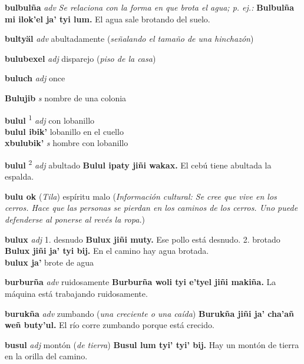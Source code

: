 \documentclass[10pt]{scrbook}
\newcommand{\entry}[1]{\textbf{#1}}
\newcommand{\onedefinition}[1]{#1.}
\newcommand{\defsuperscript}[1]{\textsuperscript{#1}}
\newcommand{\nontranslationdef}[1]{\textit{#1}}
\newcommand{\partofspeech}[1]{\textit{#1}}
\newcommand{\spanishtranslation}[1]{#1}
\newcommand{\clarification}[1]{(\textit{#1})}
\newcommand{\cholexample}[1]{\textbf{#1}}
\newcommand{\exampletranslation}[1]{#1}
\newcommand{\relevantdialect}[1]{(\textit{#1})}
\newcommand{\culturalinformation}[1]{(\textit{#1})}
\newcommand{\secondaryentry}[1]{\\\textbf{#1}}
\newcommand{\secondpartofspeech}[1]{\textit{#1}}
\newcommand{\secondtranslation}[1]{#1}
\begin{document}
\begin{multicols}{2}
\entry{bulbulña}
\partofspeech{adv}
\nontranslationdef{Se relaciona con la forma en que brota el agua; p. ej.:}
\cholexample{Bulbulña mi ilok'el ja' tyi lum.}
\exampletranslation{El agua sale brotando del suelo.}

\entry{bultyäl}
\partofspeech{adv}
\spanishtranslation{abultadamente}
\clarification{señalando el tamaño de una hinchazón}

\entry{bulubexel}
\partofspeech{adj}
\spanishtranslation{disparejo}
\clarification{piso de la casa}

\entry{buluch}
\partofspeech{adj}
\spanishtranslation{once}

\entry{Bulujib}
\partofspeech{s}
\spanishtranslation{nombre de una colonia}

\entry{bulul}
\defsuperscript{1}
\partofspeech{adj}
\spanishtranslation{con lobanillo}
\secondaryentry{bulul ibik'}
\secondtranslation{lobanillo en el cuello}
\secondaryentry{xbulubik'}
\secondpartofspeech{s}
\secondtranslation{hombre con lobanillo}

\entry{bulul}
\defsuperscript{2}
\partofspeech{adj}
\spanishtranslation{abultado}
\cholexample{Bulul ipaty jiñi wakax.}
\exampletranslation{El cebú tiene abultada la espalda.}

\entry{bulu ok}
\relevantdialect{Tila}
\spanishtranslation{espíritu malo}
\culturalinformation{Información cultural: Se cree que vive en los cerros. Hace que las personas se pierdan en los caminos de los cerros. Uno puede defenderse al ponerse al revés la ropa.}

\entry{bulux}
\partofspeech{adj}
\onedefinition{1}
\spanishtranslation{desnudo}
\cholexample{Bulux jiñi muty.}
\exampletranslation{Ese pollo está desnudo.}
\onedefinition{2}
\spanishtranslation{brotado}
\cholexample{Bulux jiñi ja' tyi bij.}
\exampletranslation{En el camino hay agua brotada.}
\secondaryentry{bulux ja'}
\secondtranslation{brote de agua}

\entry{burburña}
\partofspeech{adv}
\spanishtranslation{ruidosamente}
\cholexample{Burburña woli tyi e'tyel jiñi makiña.}
\exampletranslation{La máquina está trabajando ruidosamente.}

\entry{burukña}
\partofspeech{adv}
\spanishtranslation{zumbando}
\clarification{una creciente o una caída}
\cholexample{Burukña jiñi ja' cha'añ weñ buty'ul.}
\exampletranslation{El río corre zumbando porque está crecido.}

\entry{busul}
\partofspeech{adj}
\spanishtranslation{montón}
\clarification{de tierra}
\cholexample{Busul lum tyi' tyi' bij.}
\exampletranslation{Hay un montón de tierra en la orilla del camino.}


\end{multicols}
\end{document}
